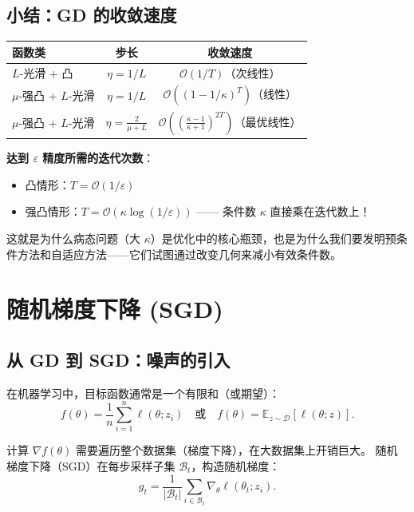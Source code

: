 \documentclass[12pt,a4paper]{ctexart}
\theoremstyle{definition}
\theoremstyle{plain}
\newcommand{\E}{\mathbb{E}}
\newcommand{\eps}{\varepsilon}
\newcommand{\grad}{\nabla}
\begin{document}
\subsection{小结：GD 的收敛速度}

\begin{center}
\begin{tabular}{lcc}
\toprule
函数类 & 步长 & 收敛速度 \\
\midrule
$L$-光滑 + 凸 & $\eta = 1/L$ & $\mathcal{O}(1/T)$（次线性）\\
$\mu$-强凸 + $L$-光滑 & $\eta = 1/L$ & $\mathcal{O}((1 - 1/\kappa)^T)$（线性）\\
$\mu$-强凸 + $L$-光滑 & $\eta = \frac{2}{\mu+L}$ & $\mathcal{O}\!\left(\left(\frac{\kappa-1}{\kappa+1}\right)^{2T}\right)$（最优线性）\\
\bottomrule
\end{tabular}
\end{center}

\textbf{达到 $\eps$ 精度所需的迭代次数}：
\begin{itemize}
  \item 凸情形：$T = \mathcal{O}(1/\eps)$
  \item 强凸情形：$T = \mathcal{O}(\kappa \log(1/\eps))$ —— 条件数 $\kappa$ 直接乘在迭代数上！
\end{itemize}

这就是为什么病态问题（大 $\kappa$）是优化中的核心瓶颈，也是为什么我们要发明预条件方法和自适应方法——它们试图通过改变几何来减小有效条件数。

\section{随机梯度下降 (SGD)}

\subsection{从 GD 到 SGD：噪声的引入}

在机器学习中，目标函数通常是一个有限和（或期望）：
\begin{equation}\label{eq:erm}
  f(\theta) = \frac{1}{n} \sum_{i=1}^{n} \ell(\theta; z_i) \quad \text{或} \quad f(\theta) = \E_{z \sim \mathcal{D}}[\ell(\theta; z)].
\end{equation}

计算 $\grad f(\theta)$ 需要遍历整个数据集（梯度下降），在大数据集上开销巨大。
随机梯度下降（SGD）在每步采样子集 $\mathcal{B}_t$，构造随机梯度：
\begin{equation}\label{eq:sg}
  g_t = \frac{1}{|\mathcal{B}_t|} \sum_{i \in \mathcal{B}_t} \grad_\theta \ell(\theta_t; z_i).
\end{equation}
\end{document}
